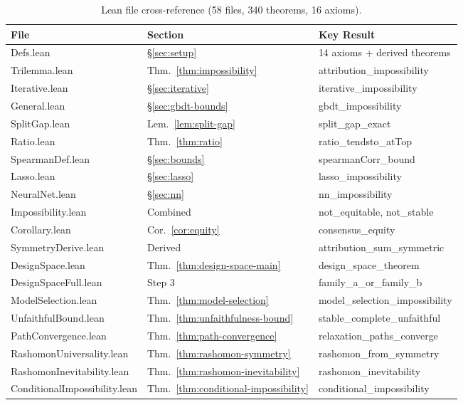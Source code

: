 \documentclass{article}
\begin{document}
\begin{table}[t]
\centering
\caption{Lean file cross-reference (58 files, 340 theorems, 16 axioms).}
\label{tab:lean-crossref}
\footnotesize
\begin{tabular}{@{}lll@{}}
\toprule
\textbf{File} & \textbf{Section} & \textbf{Key Result} \\
\midrule
Defs.lean & \S\ref{sec:setup} & 14 axioms + derived theorems \\
Trilemma.lean & Thm.~\ref{thm:impossibility} & attribution\_impossibility \\
Iterative.lean & \S\ref{sec:iterative} & iterative\_impossibility \\
General.lean & \S\ref{sec:gbdt-bounds} & gbdt\_impossibility \\
SplitGap.lean & Lem.~\ref{lem:split-gap} & split\_gap\_exact \\
Ratio.lean & Thm.~\ref{thm:ratio} & ratio\_tendsto\_atTop \\
SpearmanDef.lean & \S\ref{sec:bounds} & spearmanCorr\_bound \\
Lasso.lean & \S\ref{sec:lasso} & lasso\_impossibility \\
NeuralNet.lean & \S\ref{sec:nn} & nn\_impossibility \\
Impossibility.lean & Combined & not\_equitable, not\_stable \\
Corollary.lean & Cor.~\ref{cor:equity} & consensus\_equity \\
SymmetryDerive.lean & Derived & attribution\_sum\_symmetric \\
DesignSpace.lean & Thm.~\ref{thm:design-space-main} & design\_space\_theorem \\
DesignSpaceFull.lean & Step 3 & family\_a\_or\_family\_b \\
ModelSelection.lean & Thm.~\ref{thm:model-selection} & model\_selection\_impossibility \\
UnfaithfulBound.lean & Thm.~\ref{thm:unfaithfulness-bound} & stable\_complete\_unfaithful \\
PathConvergence.lean & Thm.~\ref{thm:path-convergence} & relaxation\_paths\_converge \\
RashomonUniversality.lean & Thm.~\ref{thm:rashomon-symmetry} & rashomon\_from\_symmetry \\
RashomonInevitability.lean & Thm.~\ref{thm:rashomon-inevitability} & rashomon\_inevitability \\
ConditionalImpossibility.lean & Thm.~\ref{thm:conditional-impossibility} & conditional\_impossibility \\

\end{tabular}
\end{table}
\end{document}

